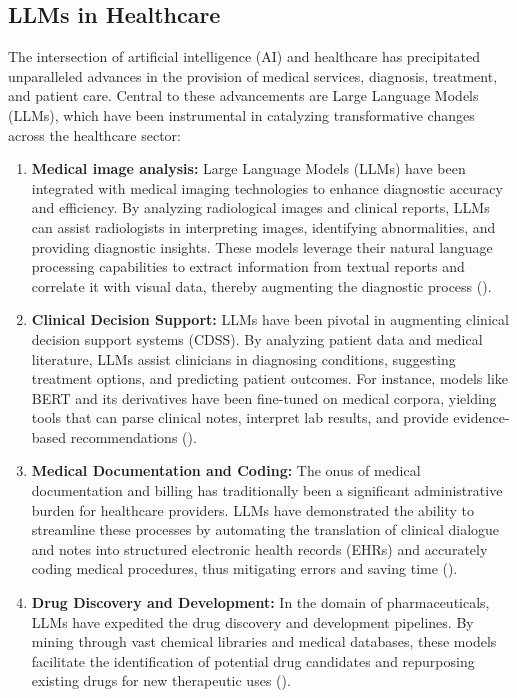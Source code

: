 \subsection{LLMs in Healthcare}
\label{subsec:llms-in-healthcare}

The intersection of artificial intelligence (AI) and healthcare has precipitated unparalleled advances in the provision of medical services, diagnosis, treatment, and patient care.
Central to these advancements are Large Language Models (LLMs), which have been instrumental in catalyzing transformative changes across the healthcare sector:

\begin{enumerate}
	\item \textbf{Medical image analysis:}{
		      Large Language Models (LLMs) have been integrated with medical imaging technologies to enhance diagnostic accuracy and efficiency.
		      By analyzing radiological images and clinical reports, LLMs can assist radiologists in interpreting images, identifying abnormalities, and providing diagnostic insights.
		      These models leverage their natural language processing capabilities to extract information from textual reports and correlate it with visual data, thereby augmenting the diagnostic process (\textcite{li2021survey, zhang2021medical}).
	      }

	\item \textbf{Clinical Decision Support:}{
		      LLMs have been pivotal in augmenting clinical decision support systems (CDSS). By analyzing patient data and medical literature, LLMs assist clinicians in diagnosing conditions, suggesting treatment options, and predicting patient outcomes. For instance, models like BERT and its derivatives have been fine-tuned on medical corpora, yielding tools that can parse clinical notes, interpret lab results, and provide evidence-based recommendations (\textcite{alsentzer2019publicly}).
	      }

	\item \textbf{Medical Documentation and Coding:}{
		      The onus of medical documentation and billing has traditionally been a significant administrative burden for healthcare providers. LLMs have demonstrated the ability to streamline these processes by automating the translation of clinical dialogue and notes into structured electronic health records (EHRs) and accurately coding medical procedures, thus mitigating errors and saving time (\textcite{shickel2018deep}).
	      }

	\item \textbf{Drug Discovery and Development:}{
		      In the domain of pharmaceuticals, LLMs have expedited the drug discovery and development pipelines. By mining through vast chemical libraries and medical databases, these models facilitate the identification of potential drug candidates and repurposing existing drugs for new therapeutic uses (\textcite{zhavoronkov2019deep}).
	      }


\end{enumerate}
